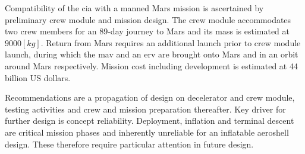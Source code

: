 Compatibility of the \gls{cia} with a manned Mars mission is ascertained by preliminary crew module and mission design. The crew module accommodates two crew members for an 89-day journey to Mars and its mass is estimated at $9000 \left[ kg \right] $. Return from Mars requires an additional launch prior to crew module launch, during which the \acrlong{mav} and an \acrlong{erv} are brought onto Mars and in an orbit around Mars respectively. Mission cost including development is estimated at 44 billion US dollars.

Recommendations are a propagation of design on decelerator and crew module, testing activities and crew and mission preparation thereafter. Key driver for further design is concept reliability. Deployment, inflation and terminal descent are critical mission phases and inherently unreliable for an inflatable aeroshell design. These therefore require particular attention in future design.


